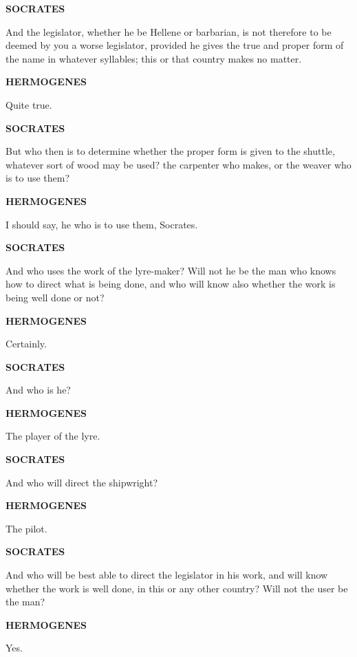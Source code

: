 \documentclass[11pt,letter]{article}
\begin{document}
\par \textbf{SOCRATES}
\par   And the legislator, whether he be Hellene or barbarian, is not therefore to be deemed by you a worse legislator, provided he gives the true and proper form of the name in whatever syllables; this or that country makes no matter.

\par \textbf{HERMOGENES}
\par   Quite true.

\par \textbf{SOCRATES}
\par   But who then is to determine whether the proper form is given to the shuttle, whatever sort of wood may be used? the carpenter who makes, or the weaver who is to use them?

\par \textbf{HERMOGENES}
\par   I should say, he who is to use them, Socrates.

\par \textbf{SOCRATES}
\par   And who uses the work of the lyre-maker? Will not he be the man who knows how to direct what is being done, and who will know also whether the work is being well done or not?

\par \textbf{HERMOGENES}
\par   Certainly.

\par \textbf{SOCRATES}
\par   And who is he?

\par \textbf{HERMOGENES}
\par   The player of the lyre.

\par \textbf{SOCRATES}
\par   And who will direct the shipwright?

\par \textbf{HERMOGENES}
\par   The pilot.

\par \textbf{SOCRATES}
\par   And who will be best able to direct the legislator in his work, and will know whether the work is well done, in this or any other country? Will not the user be the man?

\par \textbf{HERMOGENES}
\par   Yes.
\end{document}
